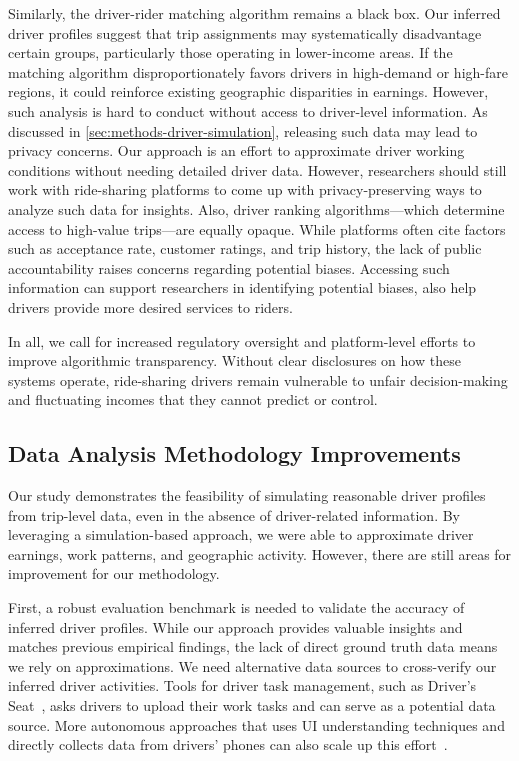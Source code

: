 Similarly, the driver-rider matching algorithm remains a black box. Our inferred driver profiles suggest that trip assignments may systematically disadvantage certain groups, particularly those operating in lower-income areas. If the matching algorithm disproportionately favors drivers in high-demand or high-fare regions, it could reinforce existing geographic disparities in earnings. However, such analysis is hard to conduct without access to driver-level information. As discussed in \cref{sec:methods-driver-simulation}, releasing such data may lead to privacy concerns. Our approach is an effort to approximate driver working conditions without needing detailed driver data. However, researchers should still work with ride-sharing platforms to come up with privacy-preserving ways to analyze such data for insights. Also, driver ranking algorithms---which determine access to high-value trips---are equally opaque. While platforms often cite factors such as acceptance rate, customer ratings, and trip history, the lack of public accountability raises concerns regarding potential biases. Accessing such information can support researchers in identifying potential biases, also help drivers provide more desired services to riders.

In all, we call for increased regulatory oversight and platform-level efforts to improve algorithmic transparency. Without clear disclosures on how these systems operate, ride-sharing drivers remain vulnerable to unfair decision-making and fluctuating incomes that they cannot predict or control.

\subsection{Data Analysis Methodology Improvements}
Our study demonstrates the feasibility of simulating reasonable driver profiles from trip-level data, even in the absence of driver-related information. By leveraging a simulation-based approach, we were able to approximate driver earnings, work patterns, and geographic activity. However, there are still areas for improvement for our methodology.

First, a robust evaluation benchmark is needed to validate the accuracy of inferred driver profiles. While our approach provides valuable insights and matches previous empirical findings, the lack of direct ground truth data means we rely on approximations. We need alternative data sources to cross-verify our inferred driver activities. Tools for driver task management, such as Driver's Seat~\cite{calacci2023access}, asks drivers to upload their work tasks and can serve as a potential data source. More autonomous approaches that uses UI understanding techniques and directly collects data from drivers' phones can also scale up this effort~\cite{lu2024crepe}. 

